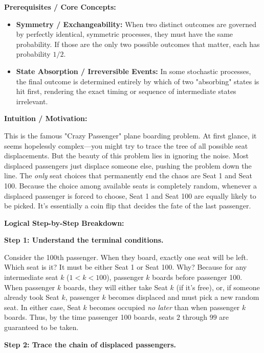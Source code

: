 \begin{solution}
\textbf{Prerequisites / Core Concepts:}
\begin{itemize}
    \item \textbf{Symmetry / Exchangeability:} When two distinct outcomes are governed by perfectly identical, symmetric processes, they must have the same probability. If those are the only two possible outcomes that matter, each has probability $1/2$.
    \item \textbf{State Absorption / Irreversible Events:} In some stochastic processes, the final outcome is determined entirely by which of two "absorbing" states is hit first, rendering the exact timing or sequence of intermediate states irrelevant.
\end{itemize}

\textbf{Intuition / Motivation:}

This is the famous "Crazy Passenger" plane boarding problem. At first glance, it seems hopelessly complex—you might try to trace the tree of all possible seat displacements. But the beauty of this problem lies in ignoring the noise. Most displaced passengers just displace someone else, pushing the problem down the line. The \textit{only} seat choices that permanently end the chaos are Seat 1 and Seat 100. Because the choice among available seats is completely random, whenever a displaced passenger is forced to choose, Seat 1 and Seat 100 are equally likely to be picked. It's essentially a coin flip that decides the fate of the last passenger.

\textbf{Logical Step-by-Step Breakdown:}

\textbf{Step 1: Understand the terminal conditions.}

Consider the 100th passenger. When they board, exactly one seat will be left. Which seat is it?
It must be either Seat 1 or Seat 100.
Why? Because for any intermediate seat $k$ ($1 < k < 100$), passenger $k$ boards before passenger 100. When passenger $k$ boards, they will either take Seat $k$ (if it's free), or, if someone already took Seat $k$, passenger $k$ becomes displaced and must pick a new random seat. In either case, Seat $k$ becomes occupied \textit{no later} than when passenger $k$ boards. Thus, by the time passenger 100 boards, seats $2$ through $99$ are guaranteed to be taken.

\textbf{Step 2: Trace the chain of displaced passengers.}


\end{solution}

